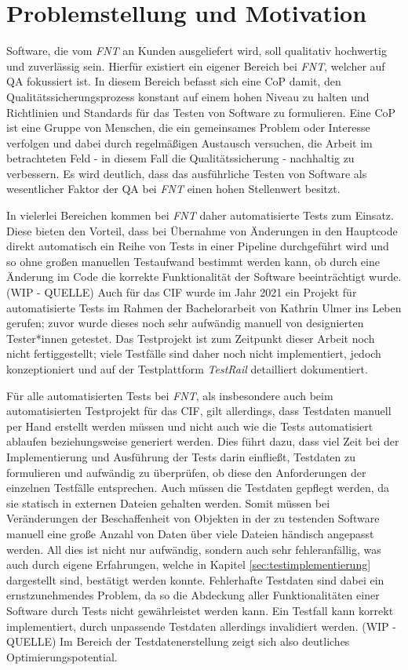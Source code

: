 \section{Problemstellung und Motivation}\label{sec:motivation}
Software, die vom \textit{FNT} an Kunden ausgeliefert wird, soll qualitativ hochwertig und zuverlässig sein. Hierfür existiert ein eigener Bereich bei \textit{FNT}, welcher auf \ac{QA} fokussiert ist. In diesem Bereich befasst sich eine \ac{CoP} damit, den Qualitätssicherungsprozess konstant auf einem hohen Niveau zu halten und Richtlinien und Standards für das Testen von Software zu formulieren. Eine \ac{CoP} ist eine Gruppe von Menschen, die ein gemeinsames Problem oder Interesse verfolgen und dabei durch regelmäßigen Austausch versuchen, die Arbeit im betrachteten Feld - in diesem Fall die Qualitätssicherung - nachhaltig zu verbessern. \cite{wenger:2022} Es wird deutlich, dass das ausführliche Testen von Software als wesentlicher Faktor der \ac{QA} bei \textit{FNT} einen hohen Stellenwert besitzt.

In vielerlei Bereichen kommen bei \textit{FNT} daher automatisierte Tests zum Einsatz. Diese bieten den Vorteil, dass bei Übernahme von Änderungen in den Hauptcode direkt automatisch ein Reihe von Tests in einer Pipeline durchgeführt wird und so ohne großen manuellen Testaufwand bestimmt werden kann, ob durch eine Änderung im Code die korrekte Funktionalität der Software beeinträchtigt wurde. (WIP - QUELLE) Auch für das \ac{CIF} wurde im Jahr 2021 ein Projekt für automatisierte Tests im Rahmen der Bachelorarbeit von Kathrin Ulmer ins Leben gerufen; zuvor wurde dieses noch sehr aufwändig manuell von designierten Tester*innen getestet. \cite{ulmer:2021} Das Testprojekt ist zum Zeitpunkt dieser Arbeit noch nicht fertiggestellt; viele Testfälle sind daher noch nicht implementiert, jedoch konzeptioniert und auf der Testplattform \textit{TestRail} detailliert dokumentiert.

Für alle automatisierten Tests bei \textit{FNT}, als insbesondere auch beim automatisierten Testprojekt für das \ac{CIF}, gilt allerdings, dass Testdaten manuell per Hand erstellt werden müssen und nicht auch wie die Tests automatisiert ablaufen beziehungsweise generiert werden. Dies führt dazu, dass viel Zeit bei der Implementierung und Ausführung der Tests darin einfließt, Testdaten zu formulieren und aufwändig zu überprüfen, ob diese den Anforderungen der einzelnen Testfälle entsprechen. Auch müssen die Testdaten gepflegt werden, da sie statisch in externen Dateien gehalten werden. Somit müssen bei Veränderungen der Beschaffenheit von Objekten in der zu testenden Software manuell eine große Anzahl von Daten über viele Dateien händisch angepasst werden. All dies ist nicht nur aufwändig, sondern auch sehr fehleranfällig, was auch durch eigene Erfahrungen, welche in Kapitel \ref{sec:testimplementierung} dargestellt sind, bestätigt werden konnte. Fehlerhafte Testdaten sind dabei ein ernstzunehmendes Problem, da so die Abdeckung aller Funktionalitäten einer Software durch Tests nicht gewährleistet werden kann. Ein Testfall kann korrekt implementiert, durch unpassende Testdaten allerdings invalidiert werden. (WIP - QUELLE) Im Bereich der Testdatenerstellung zeigt sich also deutliches Optimierungspotential.

